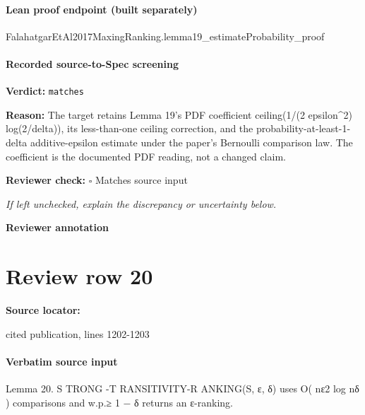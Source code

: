 \documentclass[10pt]{article}
\newcommand{\reviewerbox}{%
  \par\noindent\fbox{\parbox{0.96\linewidth}{\rule{0pt}{0.38in}}}\par
}
\newcommand{\reviewmatch}[1]{%
  \par\noindent\textbf{Reviewer check:} $\square$\; #1\par
  \noindent\emph{If left unchecked, explain the discrepancy or uncertainty below.}\par
}
\begin{document}
\paragraph{Lean proof endpoint (built separately)}\begin{ReviewVerbatim}
FalahatgarEtAl2017MaxingRanking.lemma19_estimateProbability_proof
\end{ReviewVerbatim}

\paragraph{Recorded source-to-Spec screening}
\textbf{Verdict:} \texttt{matches}
\\
{\raggedright
\textbf{Reason:} The target retains Lemma 19's PDF coefficient ceiling(1/\allowbreak{}(2 epsilon\textasciicircum{}2) log(2/\allowbreak{}delta)), its less-\allowbreak{}than-\allowbreak{}one ceiling correction, and the probability-\allowbreak{}at-\allowbreak{}least-\allowbreak{}1-\allowbreak{}delta additive-\allowbreak{}epsilon estimate under the paper's Bernoulli comparison law.\allowbreak{} The coefficient is the documented PDF reading, not a changed claim.\allowbreak{}
\par}
\reviewmatch{Matches source input}
\noindent\textbf{Reviewer annotation}\par
\reviewerbox
\clearpage
\hypertarget{source-claim-840a61f4766c5bed}{}
\section*{Review row 20}
\textbf{Source locator:} {\footnotesize\raggedright cited publication, lines 1202-\allowbreak{}1203\par}
\paragraph{Verbatim source input}
\begin{ReviewVerbatim}
Lemma 20. S TRONG -T RANSITIVITY-R ANKING(S, ε, δ) uses O( nε2 log nδ ) comparisons and w.p.≥ 1 − δ
returns an ε-ranking.
\end{ReviewVerbatim}
\end{document}
